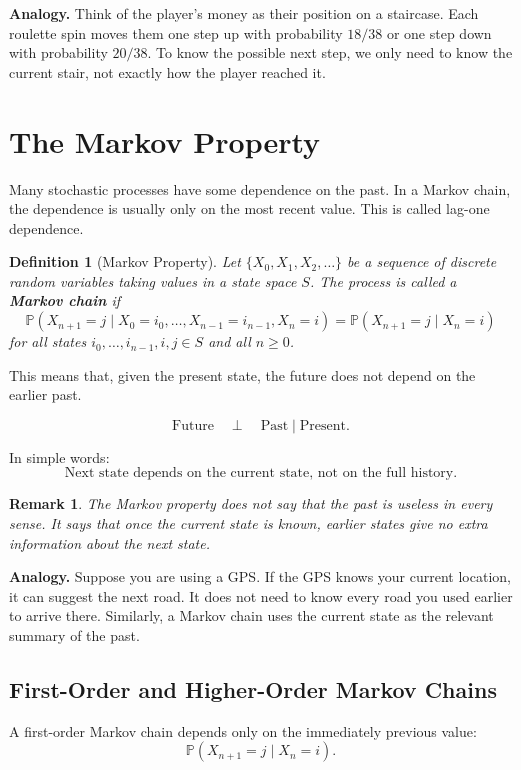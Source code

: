 \documentclass[12pt,a4paper]{article}
\theoremstyle{lecturestyle}
\newtheorem{definition}{Definition}
\newtheorem{remark}{Remark}
\newcommand{\Prob}{\mathbb{P}}
\begin{document}
\textbf{Analogy.} Think of the player's money as their position on a staircase. Each roulette spin moves them one step up with probability $18/38$ or one step down with probability $20/38$. To know the possible next step, we only need to know the current stair, not exactly how the player reached it.

\section{The Markov Property}

Many stochastic processes have some dependence on the past. In a Markov chain, the dependence is usually only on the most recent value. This is called lag-one dependence.

\begin{definition}[Markov Property]
Let $\{X_0,X_1,X_2,\ldots\}$ be a sequence of discrete random variables taking values in a state space $S$. The process is called a \textbf{Markov chain} if
\[
\Prob(X_{n+1}=j \mid X_0=i_0,\ldots,X_{n-1}=i_{n-1},X_n=i)
=
\Prob(X_{n+1}=j \mid X_n=i)
\]
for all states $i_0,\ldots,i_{n-1},i,j\in S$ and all $n\geq 0$.
\end{definition}

This means that, given the present state, the future does not depend on the earlier past.

\[
\text{Future} \quad \perp \quad \text{Past} \mid \text{Present}.
\]

In simple words:
\[
\text{Next state depends on the current state, not on the full history.}
\]

\begin{remark}
The Markov property does not say that the past is useless in every sense. It says that once the current state is known, earlier states give no extra information about the next state.
\end{remark}

\textbf{Analogy.} Suppose you are using a GPS. If the GPS knows your current location, it can suggest the next road. It does not need to know every road you used earlier to arrive there. Similarly, a Markov chain uses the current state as the relevant summary of the past.

\subsection{First-Order and Higher-Order Markov Chains}

A first-order Markov chain depends only on the immediately previous value:
\[
\Prob(X_{n+1}=j \mid X_n=i).
\]
\end{document}
